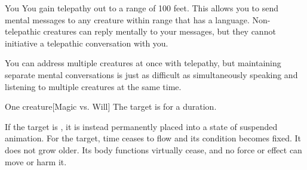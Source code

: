 \begin{spellheader}
    \spelldur{\durlong}
\end{spellheader}
\begin{spelleffects}
    \begin{spelltarget}{You}
        \spelleffect You gain telepathy out to a range of 100 feet. This allows you to send mental messages to any creature within range that has a language. Non-telepathic creatures can reply mentally to your messages, but they cannot initiative a telepathic conversation with you.

        You can address multiple creatures at once with telepathy, but maintaining separate mental conversations is just as difficult as simultaneously speaking and listening to multiple creatures at the same time. 
    \end{spelltarget}
\end{spelleffects}

\begin{spellheader}
\end{spellheader}
\begin{spelleffects}
    \begin{spelltarget}{One creature}[Magic vs. Will]
        \spellsuccess The target is \slowed for a \durlong duration.

        If the target is \bloodied, it is instead permanently placed into a state of suspended animation. For the target, time ceases to flow and its condition becomes fixed. It does not grow older. Its body functions virtually cease, and no force or effect can move or harm it.
    \end{spelltarget}
\end{spelleffects}

